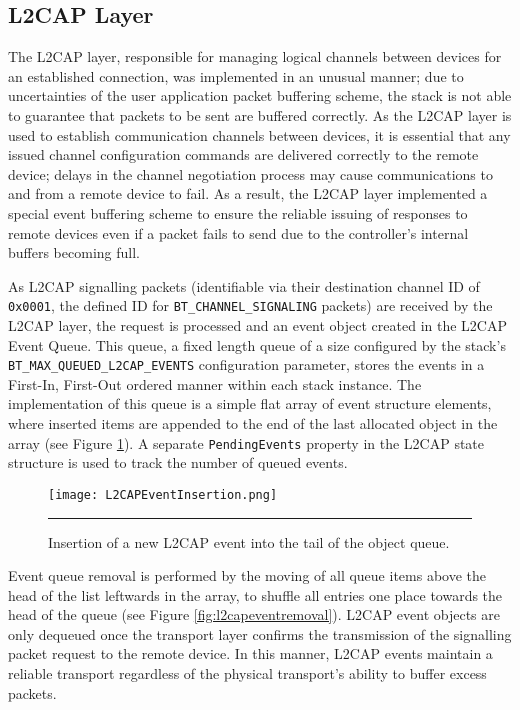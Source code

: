 \subsection{L2CAP Layer}

The L2CAP layer, responsible for managing logical channels between devices for an established connection, was implemented in an unusual manner; due to uncertainties of the user application packet buffering scheme, the stack is not able to guarantee that packets to be sent are buffered correctly. As the L2CAP layer is used to establish communication channels between devices, it is essential that any issued channel configuration commands are delivered correctly to the remote device; delays in the channel negotiation process may cause communications to and from a remote device to fail. As a result, the L2CAP layer implemented a special event buffering scheme to ensure the reliable issuing of responses to remote devices even if a packet fails to send due to the controller's internal buffers becoming full.

As L2CAP signalling packets (identifiable via their destination channel ID of \texttt{0x0001}, the defined ID for \lstinline{BT_CHANNEL_SIGNALING} packets) are received by the L2CAP layer, the request is processed and an event object created in the L2CAP Event Queue. This queue, a fixed length queue of a size configured by the stack's \lstinline{BT_MAX_QUEUED_L2CAP_EVENTS} configuration parameter, stores the events in a First-In, First-Out ordered manner within each stack instance. The implementation of this queue is a simple flat array of event structure elements, where inserted items are appended to the end of the last allocated object in the array (see Figure \ref{fig:l2capeventinsertion}). A separate \lstinline{PendingEvents} property in the L2CAP state structure is used to track the number of queued events.

\begin{figure}[tbph]
	\vspace{1em}
	\centering
		\texttt{[image: L2CAPEventInsertion.png]}
	\rule{35em}{0.5pt}
	\caption[L2CAP event object queue insertion]{Insertion of a new L2CAP event into the tail of the object queue.}
	\label{fig:l2capeventinsertion}
\end{figure}

Event queue removal is performed by the moving of all queue items above the head of the list leftwards in the array, to shuffle all entries one place towards the head of the queue (see Figure \ref{fig:l2capeventremoval}). L2CAP event objects are only dequeued once the transport layer confirms the transmission of the signalling packet request to the remote device. In this manner, L2CAP events maintain a reliable transport regardless of the physical transport's ability to buffer excess packets.

